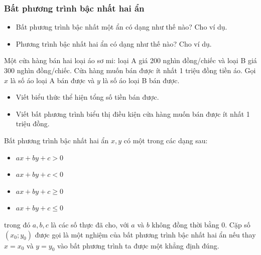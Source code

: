 



\subsubsection{Bất phương trình bậc nhất hai ẩn}

\begin{hoatdong}
\begin{itemize}
    \item Bất phương trình bậc nhất một ẩn có dạng như thế nào? Cho ví dụ.
    \item Phương trình bậc nhất hai ẩn có dạng như thế nào? Cho ví dụ.
\end{itemize}
Một cửa hàng bán hai loại áo sơ mi: loại A giá 200 nghìn đồng/chiếc và loại B giá 300 nghìn đồng/chiếc. Cửa hàng muốn bán được ít nhất 1 triệu đồng tiền áo. Gọi $x$ là số áo loại A bán được và $y$ là số áo loại B bán được.
\begin{itemize}
    \item Viết biểu thức thể hiện tổng số tiền bán được.
    \item Viết bất phương trình biểu thị điều kiện cửa hàng muốn bán được ít nhất 1 triệu đồng.
\end{itemize}
\end{hoatdong}

\begin{kienthuc}
Bất phương trình bậc nhất hai ẩn $x, y$ có một trong các dạng sau:
\begin{itemize}
    \item $ax + by + c > 0$
    \item $ax + by + c < 0$
    \item $ax + by + c \ge 0$
    \item $ax + by + c \le 0$
\end{itemize}
trong đó $a, b, c$ là các số thực đã cho, với $a$ và $b$ không đồng thời bằng $0$.
Cặp số $(x_0; y_0)$ được gọi là một nghiệm của bất phương trình bậc nhất hai ẩn nếu thay $x = x_0$ và $y = y_0$ vào bất phương trình ta được một khẳng định đúng.
\end{kienthuc}

